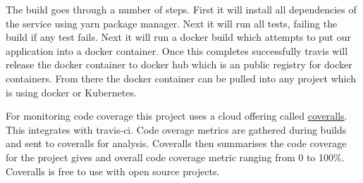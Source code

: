 The build goes through a number of steps. First it will install all dependencies of the service using yarn package manager. Next it will run all tests, failing the build if any test fails. Next it will run a docker build which attempts to put our application into a docker container. Once this completes successfully travis will release the docker container to docker hub which is an public registry for docker containers. From there the docker container can be pulled into any project which is using docker or Kubernetes.

For monitoring code coverage this project uses a cloud offering called \href{https://coveralls.io/}{coveralls}. This integrates with travis-ci. Code overage metrics are gathered during builds and sent to coveralls for analysis. Coveralls then summarises the code coverage for the project gives and overall code coverage metric ranging from 0 to 100\%. Coveralls is free to use with open source projects.